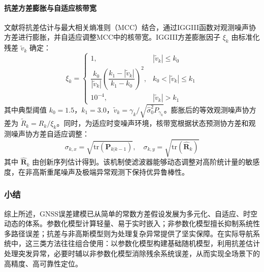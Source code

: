 \paragraph{抗差方差膨胀与自适应核带宽}
文献\cite{Xie2025}将抗差估计与最大相关熵准则（MCC）结合，通过IGGIII函数对观测噪声协方差进行膨胀，并自适应调整MCC中的核带宽。IGGIII方差膨胀因子 $\xi_k$ 由标准化残差 $\tilde{v}_k$ 确定：
\begin{equation}
\xi_k = \begin{cases}
1, & |\tilde{v}_k| \leq k_0 \\[4pt]
\dfrac{k_0}{|\tilde{v}_k|} \left( \dfrac{k_1 - |\tilde{v}_k|}{k_1 - k_0} \right)^2, & k_0 < |\tilde{v}_k| \leq k_1 \\[4pt]
10^{-4}, & |\tilde{v}_k| > k_1
\end{cases}
\label{eq:iggiii}
\end{equation}
其中典型阈值 $k_0=1.5$，$k_1=3.0$，$\tilde{v}_k = \gamma_k / \sqrt{\hat{\sigma}_0^2 P_{\gamma_k}}$。膨胀后的等效观测噪声协方差为 $\tilde{R}_k = R_k / \xi_k$。同时，为适应时变噪声环境，核带宽根据状态预测协方差和观测噪声协方差自适应调整：
\begin{equation}
\sigma_{k,x} = \sqrt{\mathrm{tr}\left(\mathbf{P}_{k|k-1}\right)}, \quad
\sigma_{k,y} = \sqrt{\mathrm{tr}\left(\hat{\mathbf{R}}_k\right)}
\label{eq:adaptive_kernel}
\end{equation}
其中 $\hat{\mathbf{R}}_k$ 由创新序列估计得到。该机制使滤波器能够动态调整对高阶统计量的敏感度，在非高斯重尾噪声及极端异常观测下保持优异鲁棒性。

\subsubsection{小结}
综上所述，GNSS误差建模已从简单的常数方差假设发展为多元化、自适应、时空动态的体系。参数化模型计算轻量、易于实时嵌入；非参数化模型擅长抑制系统性多路径误差；抗差与非高斯模型则为处理复杂异常提供了坚实保障。在实际导航系统中，这三类方法往往组合使用：以参数化模型构建基础随机模型，利用抗差估计处理突发异常，必要时辅以非参数化模型消除残余系统误差，从而实现全场景下的高精度、高可靠性定位。




